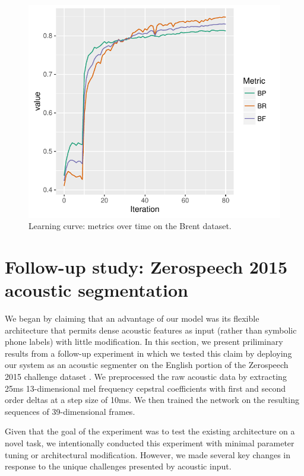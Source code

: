 \documentclass[11pt,letterpaper]{article}
\begin{document}
\begin{figure}
\includegraphics[width=\columnwidth]{learning-curve.pdf}
\caption{Learning curve: metrics over time on the Brent dataset.}
\label{fig-learning-curve}
\end{figure}

\section{Follow-up study: Zerospeech 2015 acoustic segmentation}

We began by claiming that an advantage of our model was its flexible architecture that permits dense acoustic features as input (rather than symbolic phone labels) with little modification.
In this section, we present priliminary results from a follow-up experiment in which we tested this claim by deploying our system as an acoustic segmenter on the English portion of the Zerospeech 2015 challenge dataset \cite{Versteegh15}.
We preprocessed the raw acoustic data by extracting 25ms 13-dimensional mel frequency cepstral coefficients with first and second order deltas at a step size of 10ms.
We then trained the network on the resulting sequences of 39-dimensional frames.

Given that the goal of the experiment was to test the existing architecture on a novel task, we intentionally conducted this experiment with minimal parameter tuning or architectural modification.
However, we made several key changes in response to the unique challenges presented by acoustic input.
\end{document}
